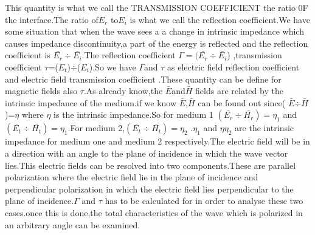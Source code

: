 This quantity is what we call the TRANSMISSION COEFFICIENT the ratio 0F the interface.The ratio of$ E_r$ to$E_i$ is what we call the reflection coefficient.We have some situation that when the wave sees a a change in intrinsic impedance which causes impedance discontinuity,a part of the energy is reflected and   the reflection coefficient is $\bar{E_r}\div\bar{E_i}$.The reflection coefficient $\Gamma=(\bar{E_r} \div\bar{E_i}$) ,transmission coefficient $\tau$=($E_t$)$\div$($E_i$).So we have $\Gamma$and $\tau$ as electric field reflection coefficient and electric field transmission coefficient .These quantity can be define for magnetic fields also $\tau$.As already know,the $\bar{E}$and$\bar{ H}$ fields are related by the intrinsic impedance of the medium.if we know $\bar{E}$,$\bar{H}$ can be found out since( $\bar{E}$$\div$$\bar{H}$)=$\eta$ where $\eta$ is the intrinsic impedance.So for medium 1 $( \bar{E_r}\div\bar{H_r})=\eta_1$  and $(\bar{E_t}\div\bar{H_t})=\eta_1$.For medium 2,$(\bar{E_t}\div\bar{H_t})=\eta_2$ .$\eta_1$ and $\eta\eta_2$ are the intrinsic impedance for medium one and medium 2 respectively.The electric field will be in a direction  with  an angle to the plane of incidence in which the wave vector lies.This electric fields can be resolved into two components.These are parallel polarization where the electric field lie in the plane of incidence and perpendicular polarization in which the electric field lies perpendicular to the plane of incidence.$\Gamma$ and $\tau$ has to be calculated for in order to analyse these two cases.once this is done,the total characteristics of the wave which is polarized in an arbitrary angle can be examined.